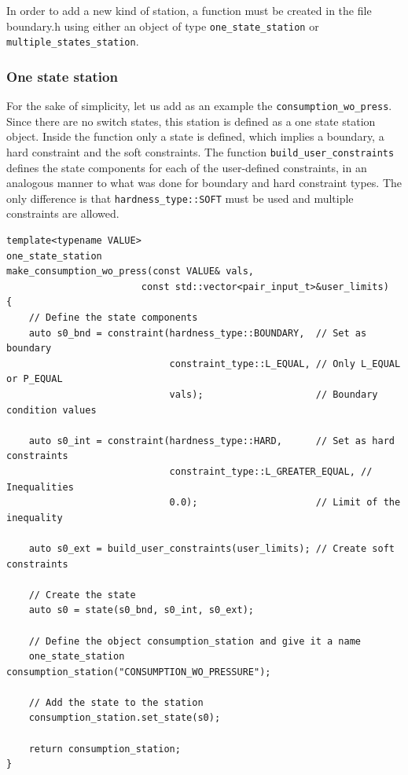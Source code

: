 In order to add a new kind of station, a function must be created in the file boundary.h using either an object of type \texttt{one\_state\_station} or \texttt{multiple\_states\_station}. 


\subsubsection{One state station}

For the sake of simplicity, let us add as an example the \texttt{consumption\_wo\_press}.  Since there are no switch states, this station is defined as a one state station object. Inside the function only a state is defined, which implies a boundary, a hard constraint and the soft constraints.
The function \texttt{build\_user\_constraints} defines the state components for each of the user-defined constraints, in an analogous manner to what was done for boundary and hard constraint types. The only difference is that \texttt{hardness\_type::SOFT} must be used and multiple constraints are allowed.
\begin{verbatim}
template<typename VALUE>
one_state_station
make_consumption_wo_press(const VALUE& vals,
                        const std::vector<pair_input_t>&user_limits)
{
    // Define the state components
    auto s0_bnd = constraint(hardness_type::BOUNDARY,  // Set as boundary 
                             constraint_type::L_EQUAL, // Only L_EQUAL or P_EQUAL 
                             vals);                    // Boundary condition values 

    auto s0_int = constraint(hardness_type::HARD,      // Set as hard constraints             
                             constraint_type::L_GREATER_EQUAL, // Inequalities 
                             0.0);                     // Limit of the inequality
    
    auto s0_ext = build_user_constraints(user_limits); // Create soft constraints

    // Create the state
    auto s0 = state(s0_bnd, s0_int, s0_ext);
    
    // Define the object consumption_station and give it a name
    one_state_station    consumption_station("CONSUMPTION_WO_PRESSURE"); 
    
    // Add the state to the station
    consumption_station.set_state(s0);

    return consumption_station;
}
    \end{verbatim}

